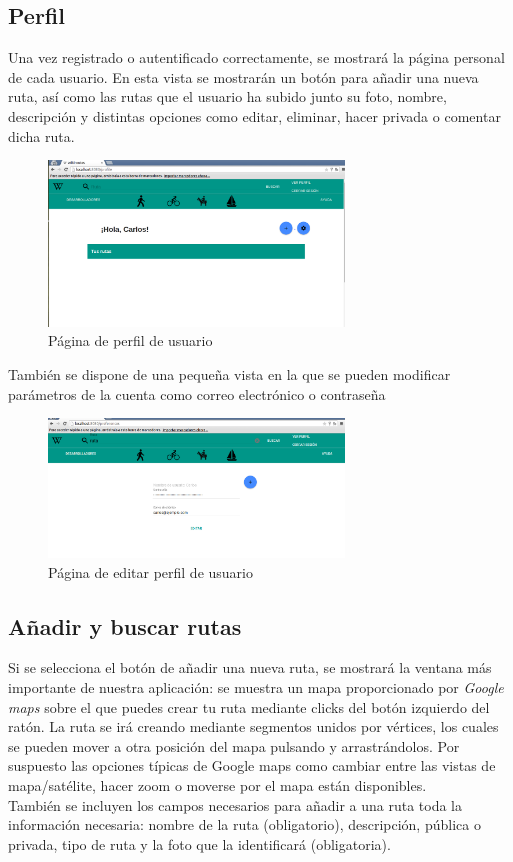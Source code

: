 \documentclass[11pt,a4paper]{article}
\begin{document}
\subsection{Perfil}
Una vez registrado o autentificado correctamente, se mostrará  la página personal de cada usuario. En esta vista se mostrarán un botón para añadir una nueva ruta, así como las rutas que el usuario ha subido junto su foto, nombre, descripción y distintas opciones como editar, eliminar, hacer privada o comentar dicha ruta. 
\begin{figure}[h]
\centering
  \includegraphics[width=0.7\textwidth]{./imagenes/perfil}
  \caption{Página de perfil de usuario}
  \label{fig: Página de perfil de usuario}
\end{figure}

También se dispone de una pequeña vista en la que se pueden modificar parámetros de la cuenta como correo electrónico o contraseña
\begin{figure}[h]
\centering
  \includegraphics[width=0.7\textwidth]{./imagenes/editar}
  \caption{Página de editar perfil de usuario}
  \label{fig: Página de editar perfil de usuario}
\end{figure}
\clearpage
\subsection{Añadir y buscar rutas}
Si se selecciona el botón de añadir una nueva ruta, se mostrará la ventana más importante de nuestra aplicación: se muestra un mapa proporcionado por \textit{Google maps} sobre el que puedes crear tu ruta mediante clicks del botón izquierdo del ratón. La ruta se irá creando mediante segmentos unidos por vértices, los cuales se pueden mover a otra posición del mapa pulsando y arrastrándolos. Por suspuesto las opciones típicas de Google maps como cambiar entre las vistas de mapa/satélite, hacer zoom o moverse por el mapa están disponibles.\\
También se incluyen los campos necesarios para añadir a una ruta toda la información necesaria: nombre de la ruta (obligatorio), descripción, pública o privada, tipo de ruta y la foto que la identificará (obligatoria).\\
\end{document}
